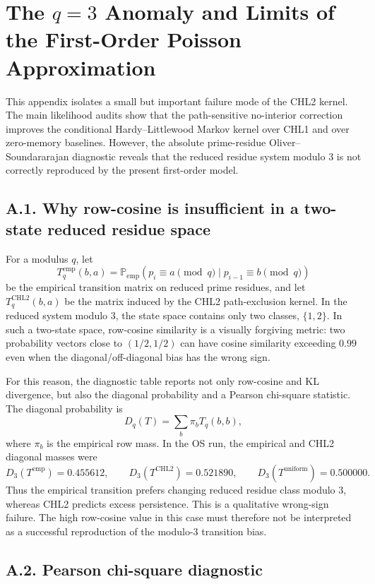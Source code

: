 \documentclass[10pt]{article}
\begin{document}
\section{The $q=3$ Anomaly and Limits of the First-Order Poisson Approximation}\label{app:q3}

This appendix isolates a small but important failure mode of the CHL2 kernel.  The main likelihood audits show that the path-sensitive no-interior correction improves the conditional Hardy--Littlewood Markov kernel over CHL1 and over zero-memory baselines.  However, the absolute prime-residue Oliver--Soundararajan diagnostic reveals that the reduced residue system modulo $3$ is not correctly reproduced by the present first-order model.

\subsection*{A.1. Why row-cosine is insufficient in a two-state reduced residue space}

For a modulus $q$, let
\[
T_q^{\mathrm{emp}}(b,a)=\mathbb{P}_{\mathrm{emp}}(p_i\equiv a\pmod q\mid p_{i-1}\equiv b\pmod q)
\]
be the empirical transition matrix on reduced prime residues, and let $T_q^{\mathrm{CHL2}}(b,a)$ be the matrix induced by the CHL2 path-exclusion kernel.  In the reduced system modulo $3$, the state space contains only two classes, $\{1,2\}$.  In such a two-state space, row-cosine similarity is a visually forgiving metric: two probability vectors close to $(1/2,1/2)$ can have cosine similarity exceeding $0.99$ even when the diagonal/off-diagonal bias has the wrong sign.

For this reason, the diagnostic table reports not only row-cosine and KL divergence, but also the diagonal probability and a Pearson chi-square statistic.  The diagonal probability is
\[
D_q(T)=\sum_b \pi_b T_q(b,b),
\]
where $\pi_b$ is the empirical row mass.  In the OS run, the empirical and CHL2 diagonal masses were
\[
D_3(T^{\mathrm{emp}})=0.455612,
\qquad
D_3(T^{\mathrm{CHL2}})=0.521890,
\qquad
D_3(T^{\mathrm{uniform}})=0.500000.
\]
Thus the empirical transition prefers changing reduced residue class modulo $3$, whereas CHL2 predicts excess persistence.  This is a qualitative wrong-sign failure.  The high row-cosine value in this case must therefore not be interpreted as a successful reproduction of the modulo-$3$ transition bias.

\subsection*{A.2. Pearson chi-square diagnostic}
\end{document}
